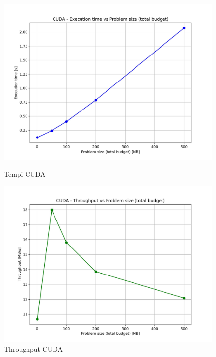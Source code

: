			\begin{figure}[H]
				\centering
				\begin{minipage}[t]{0.49\textwidth}
					\centering
					\includegraphics[width=\textwidth]{img/cuda_plots/cuda_times.jpg}
					\caption{Tempi CUDA}
					\label{fig:cuda_times}
				\end{minipage}
				\hfill
				\begin{minipage}[t]{0.49\textwidth}
					\centering
					\includegraphics[width=\textwidth]{img/cuda_plots/cuda_throughput.jpg}
					\caption{Throughput CUDA}
					\label{fig:cuda_throughput}
				\end{minipage}
			\end{figure}
			
